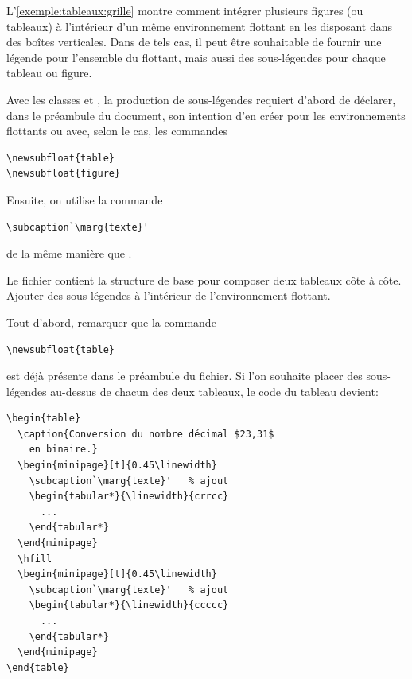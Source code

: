 \begin{exercice}
  \label{ex:tableaux:subcaptions}
  L'\autoref{exemple:tableaux:grille} montre comment intégrer
  plusieurs figures (ou tableaux) à l'intérieur d'un même
  environnement flottant en les disposant dans des boîtes verticales.
  Dans de tels cas, il peut être souhaitable de fournir une légende
  pour l'ensemble du flottant, mais aussi des sous-légendes pour
  chaque tableau ou figure.

  Avec les classes  et , la production de
  sous-légendes requiert d'abord de déclarer, dans le préambule du
  document, son intention d'en créer pour les environnements flottants
   ou  avec, selon le cas, les commandes
\begin{lstlisting}
\newsubfloat{table}
\newsubfloat{figure}
\end{lstlisting}
  Ensuite, on utilise la commande
\begin{lstlisting}
\subcaption`\marg{texte}'
\end{lstlisting}
  de la même manière que \cmd{\caption}.

  Le fichier  contient la structure
  de base pour composer deux tableaux côte à côte. Ajouter des
  sous-légendes à l'intérieur de l'environnement flottant.
  \begin{sol}
    Tout d'abord, remarquer que la commande
\begin{lstlisting}
\newsubfloat{table}
\end{lstlisting}
    est déjà présente dans le préambule du fichier. Si l'on souhaite
    placer des sous-légendes au-dessus de chacun des deux tableaux, le
    code du tableau devient:
\begin{lstlisting}
\begin{table}
  \caption{Conversion du nombre décimal $23,31$
    en binaire.}
  \begin{minipage}[t]{0.45\linewidth}
    \subcaption`\marg{texte}'   % ajout
    \begin{tabular*}{\linewidth}{crrcc}
      ...
    \end{tabular*}
  \end{minipage}
  \hfill
  \begin{minipage}[t]{0.45\linewidth}
    \subcaption`\marg{texte}'   % ajout
    \begin{tabular*}{\linewidth}{ccccc}
      ...
    \end{tabular*}
  \end{minipage}
\end{table}
\end{lstlisting}
  \end{sol}
\end{exercice}

